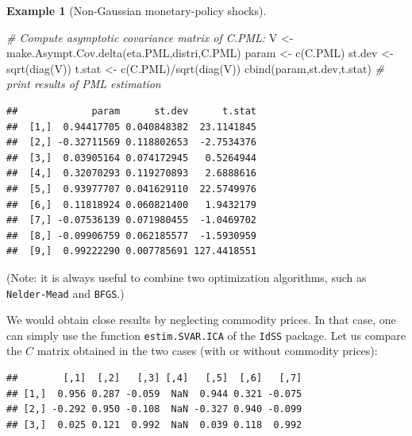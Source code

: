 \documentclass[
  12pt,
]{book}
\newenvironment{Shaded}{\begin{snugshade}}{\end{snugshade}}
\newcommand{\AttributeTok}[1]{\textcolor[rgb]{0.77,0.63,0.00}{#1}}
\newcommand{\CommentTok}[1]{\textcolor[rgb]{0.56,0.35,0.01}{\textit{#1}}}
\newcommand{\ConstantTok}[1]{\textcolor[rgb]{0.00,0.00,0.00}{#1}}
\newcommand{\DecValTok}[1]{\textcolor[rgb]{0.00,0.00,0.81}{#1}}
\newcommand{\FunctionTok}[1]{\textcolor[rgb]{0.00,0.00,0.00}{#1}}
\newcommand{\NormalTok}[1]{#1}
\newcommand{\OtherTok}[1]{\textcolor[rgb]{0.56,0.35,0.01}{#1}}
\newcommand{\SpecialCharTok}[1]{\textcolor[rgb]{0.00,0.00,0.00}{#1}}
\theoremstyle{definition}
\theoremstyle{definition}
\newtheorem{example}{Example}[chapter]
\theoremstyle{definition}
\theoremstyle{definition}
\theoremstyle{remark}
\begin{document}
\begin{example}[Non-Gaussian monetary-policy shocks]
\begin{Shaded}
\begin{Highlighting}[]
\CommentTok{\# Compute asymptotic covariance matrix of C.PML:}
\NormalTok{V }\OtherTok{\textless{}{-}} \FunctionTok{make.Asympt.Cov.delta}\NormalTok{(eta.PML,distri,C.PML)}
\NormalTok{param }\OtherTok{\textless{}{-}} \FunctionTok{c}\NormalTok{(C.PML)}
\NormalTok{st.dev }\OtherTok{\textless{}{-}} \FunctionTok{sqrt}\NormalTok{(}\FunctionTok{diag}\NormalTok{(V))}
\NormalTok{t.stat }\OtherTok{\textless{}{-}} \FunctionTok{c}\NormalTok{(C.PML)}\SpecialCharTok{/}\FunctionTok{sqrt}\NormalTok{(}\FunctionTok{diag}\NormalTok{(V))}
\FunctionTok{cbind}\NormalTok{(param,st.dev,t.stat) }\CommentTok{\# print results of PML estimation}
\end{Highlighting}
\end{Shaded}

\begin{verbatim}
##             param      st.dev      t.stat
##  [1,]  0.94417705 0.040848382  23.1141845
##  [2,] -0.32711569 0.118802653  -2.7534376
##  [3,]  0.03905164 0.074172945   0.5264944
##  [4,]  0.32070293 0.119270893   2.6888616
##  [5,]  0.93977707 0.041629110  22.5749976
##  [6,]  0.11818924 0.060821400   1.9432179
##  [7,] -0.07536139 0.071980455  -1.0469702
##  [8,] -0.09906759 0.062185577  -1.5930959
##  [9,]  0.99222290 0.007785691 127.4418551
\end{verbatim}

(Note: it is always useful to combine two optimization algorithms, such as \texttt{Nelder-Mead} and \texttt{BFGS}.)

We would obtain close results by neglecting commodity prices. In that case, one can simply use the function \texttt{estim.SVAR.ICA} of the \texttt{IdSS} package. Let us compare the \(C\) matrix obtained in the two cases (with or without commodity prices):

\begin{Shaded}
\end{Shaded}

\begin{verbatim}
##        [,1]  [,2]   [,3] [,4]   [,5]  [,6]   [,7]
## [1,]  0.956 0.287 -0.059  NaN  0.944 0.321 -0.075
## [2,] -0.292 0.950 -0.108  NaN -0.327 0.940 -0.099
## [3,]  0.025 0.121  0.992  NaN  0.039 0.118  0.992
\end{verbatim}


\end{example}
\end{document}
